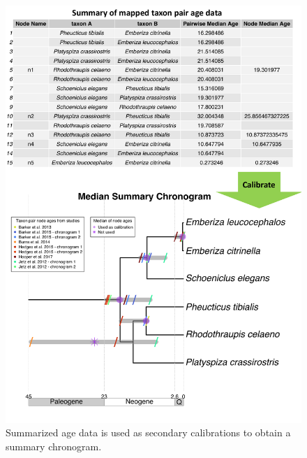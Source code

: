 \begin{figure}[!h]
\includegraphics[width=1\linewidth]{../figures/figure2/figure2-2.pdf}
\caption{
Summarized age data is used as secondary calibrations to obtain a summary chronogram.
}
\label{fig:figure2-2}
\end{figure}


